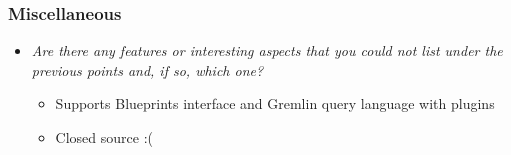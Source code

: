 
\begin{frame}
\frametitle{Miscellaneous}
\begin{itemize}
\item \emph{Are there any features or interesting aspects that you could not list under the previous points and, if so, which one?}
\begin{itemize}
	\item Supports Blueprints interface and Gremlin query language with plugins
	\item Closed source :(
\end{itemize}
\end{itemize}
\end{frame} 